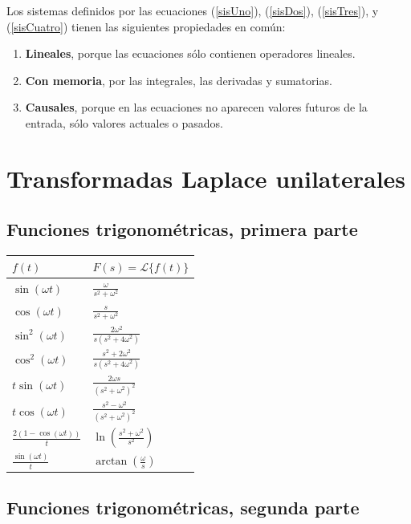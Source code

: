 \documentclass[11pt,a4paper,openany]{book}
\begin{document}
Los sistemas definidos por las ecuaciones (\ref{sisUno}), (\ref{sisDos}), (\ref{sisTres}), y (\ref{sisCuatro}) tienen las siguientes propiedades en com\'{u}n:

\begin{enumerate}
	\item \textbf{Lineales}, porque las ecuaciones s\'{o}lo contienen operadores lineales.
	\item \textbf{Con memoria}, por las integrales, las derivadas y sumatorias.
	\item \textbf{Causales}, porque en las ecuaciones no aparecen valores futuros de la entrada, s\'{o}lo valores actuales o pasados.
\end{enumerate}

\section{Transformadas Laplace unilaterales}

\subsection{Funciones trigonom\'{e}tricas, primera parte}

\begin{center}
	\renewcommand{\arraystretch}{1.8}
	\begin{tabular}{ll}
		\textbf{$f(t)$} & \textbf{$F(s) = \mathcal{L}\{f(t)\}$} \\ \hline
		$\sin(\omega t)$ & $\frac{\omega }{s^{2}+\omega ^{2}}$ \\ 
		$\cos(\omega t)$ & $\frac{s}{s^{2}+\omega ^{2}}$ \\ 
		$\sin^{2}(\omega t)$ & $\frac{2\omega ^{2}}{s(s^{2}+4\omega ^{2})}$ \\ 
		$\cos^{2}(\omega t)$ & $\frac{s^{2}+2\omega ^{2}}{s(s^{2}+4\omega ^{2})}$ \\ 
		$t\sin(\omega t)$ & $\frac{2\omega s}{(s^{2}+\omega^{2})^{2}}$ \\ 
		$t\cos(\omega t)$ & $\frac{s^{2}-\omega ^{2}}{(s^{2}+\omega^{2})^{2}}$ \\ 
		$\frac{2(1-\cos(\omega t))}{t}$ & $\ln \left( \frac{s^{2}+\omega ^{2}}{s^{2}} \right)$ \\ 
		$\frac{\sin(\omega t)}{t}$ & $\arctan \left(\frac{\omega }{s}\right)$
	\end{tabular}
\end{center}

\subsection{Funciones trigonom\'{e}tricas, segunda parte} 
\end{document}
